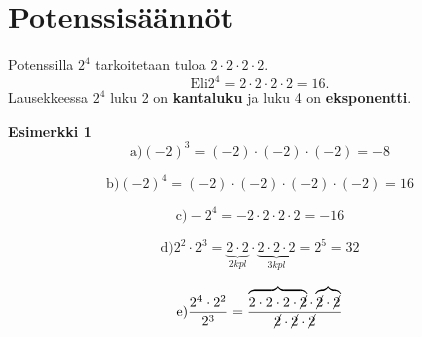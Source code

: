 \chapter{Potenssisäännöt}

Potenssilla $2^4$ tarkoitetaan tuloa $2\cdot 2\cdot 2\cdot 2$.
\begin{equation}
\text{Eli} 2^4=2\cdot 2\cdot 2\cdot 2=16.
\end{equation}
Lausekkeessa $2^4$ luku 2 on \textbf{kantaluku} ja luku 4 on \textbf{eksponentti}.

\begin{esimerkki}
\textbf{Esimerkki 1}
\begin{equation}
\text{a)} (-2)^3=(-2)\cdot (-2)\cdot (-2)=-8
\end{equation}

\begin{equation}
\text{b)} (-2)^4=(-2)\cdot (-2)\cdot (-2)\cdot (-2)=16
\end{equation}

\begin{equation}
\text{c)} -2^4=-2\cdot 2\cdot 2\cdot 2=-16
\end{equation}

\begin{equation}
\text{d)} 2^2\cdot 2^3=\underbrace{2\cdot 2}_{2 kpl}\cdot \underbrace{2\cdot 2\cdot 2}_{3 kpl}=2^5=32
\end{equation}

\begin{equation}
\text{e)}\frac{2^4\cdot 2^2}{2^3}=\frac{\overbrace{2\cdot 2\cdot 2\cdot \cancel{2}}\cdot \overbrace{\cancel{2}\cdot \cancel{2}}}{\cancel{2}\cdot \cancel{2}\cdot \cancel{2}}
\end{equation}
\end{esimerkki}


